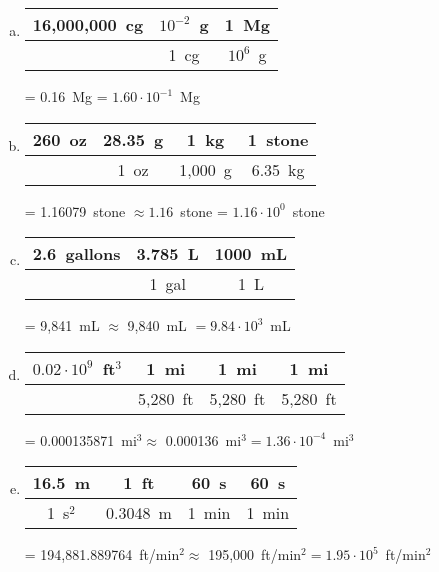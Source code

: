 \documentclass[11pt,letterpaper]{article}
\begin{document}
\begin{enumerate}[(a)]
\item \phantom{.}\par
	\begin{table}[H]
	\centering
	\begin{tabular}{c||c|c}
	16,000,000~cg & $10^{-2}$~g & 1~Mg \\ \hline
			&     1~cg	    & $10^6$~g
	\end{tabular} = 0.16~Mg = $1.60 \cdot 10^{-1}$~Mg
	\end{table} \pspace

\item \phantom{.}\par
	\begin{table}[H]
	\centering
	\begin{tabular}{c||c|c|c}
	260~oz     & 28.35~g & 1~kg		& 1~stone \\ \hline
			& 1~oz	 & 1,000~g	& 6.35~kg
	\end{tabular} = 1.16079~stone $\approx 1.16$~stone = $1.16 \cdot 10^0$~stone
	\end{table} \pspace

\item \phantom{.}\par
	\begin{table}[H]
	\centering
	\begin{tabular}{c||c|c}
	2.6~gallons & 3.785~L 	& 1000~mL \\ \hline
			   & 1~gal		& 1~L
	\end{tabular} = 9,841~mL $\approx$ 9,840~mL $= 9.84 \cdot 10^3$~mL
	\end{table} \pspace

\item \phantom{.}\par
	\begin{table}[H]
	\centering
	\hspace{-0.4cm} \begin{tabular}{c||c|c|c}
	$0.02 \cdot 10^9$~ft$^3$ & 1~mi       & 1~mi      & 1~mi \\ \hline
						& 5,280~ft & 5,280~ft & 5,280~ft
	\end{tabular} = 0.000135871~mi$^3 \approx$ 0.000136~mi$^3= 1.36 \cdot 10^{-4}$~mi$^3$
	\end{table} \pspace

\item \phantom{.}\par
	\begin{table}[H]
	\centering
	\hspace{-1.2cm} \begin{tabular}{c||c|c|c}
	16.5~m	& 1~ft		& 60~s   & 60~s \\ \hline
	1~s$^2$   & 0.3048~m      & 1~min & 1~min
	\end{tabular} = 194,881.889764~ft/min$^2 \approx$ 195,000~ft/min$^2= 1.95 \cdot 10^5$~ft/min$^2$
	\end{table} 
\end{enumerate}
\end{document}
